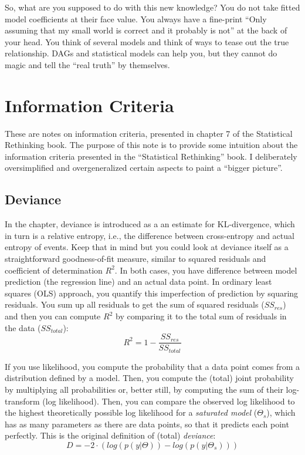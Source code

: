 \documentclass[
]{book}
\begin{document}
So, what are you supposed to do with this new knowledge? You do not take fitted model coefficients at their face value. You always have a fine-print ``Only assuming that my small world is correct and it probably is not'' at the back of your head. You think of several models and think of ways to tease out the true relationship. DAGs and statistical models can help you, but they cannot do magic and tell the ``real truth'' by themselves.

\hypertarget{information-criteria}{%
\chapter{Information Criteria}\label{information-criteria}}

These are notes on information criteria, presented in chapter 7 of the Statistical Rethinking book. The purpose of this note is to provide some intuition about the information criteria presented in the ``Statistical Rethinking'' book. I deliberately oversimplified and overgeneralized certain aspects to paint a ``bigger picture''.

\hypertarget{deviance}{%
\section{Deviance}\label{deviance}}

In the chapter, deviance is introduced as a an estimate for KL-divergence, which in turn is a relative entropy, i.e., the difference between cross-entropy and actual entropy of events. Keep that in mind but you could look at deviance itself as a straightforward goodness-of-fit measure, similar to squared residuals and coefficient of determination \(R^2\). In both cases, you have difference between model prediction (the regression line) and an actual data point. In ordinary least squares (OLS) approach, you quantify this imperfection of prediction by squaring residuals. You sum up all residuals to get the sum of squared residuals (\(SS_{res}\)) and then you can compute \(R^2\) by comparing it to the total sum of residuals in the data (\(SS_{total}\)):
\[R^2 = 1 - \frac{SS_{res}}{SS_{total}}\]

If you use likelihood, you compute the probability that a data point comes from a distribution defined by a model. Then, you compute the (total) joint probability by multiplying all probabilities or, better still, by computing the sum of their log-transform (log likelihood). Then, you can compare the observed log likelihood to the highest theoretically possible log likelihood for a \emph{saturated model} (\(\Theta_s\)), which has as many parameters as there are data points, so that it predicts each point perfectly. This is the original definition of (total) \emph{deviance}:
\[D = -2 \cdot (log(p(y|\Theta)) - log(p(y|\Theta_s)))\]
\end{document}
